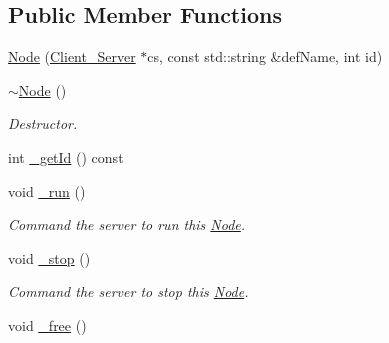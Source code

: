 \subsection*{Public Member Functions}
\begin{DoxyCompactItemize}
\item 
\hyperlink{classColliderPlusPlus_1_1Node_ab0bc89b38db96dea7086833453b8bf12}{Node} (\hyperlink{classColliderPlusPlus_1_1Client__Server}{Client\-\_\-\-Server} $\ast$cs, const std\-::string \&def\-Name, int id)
\item 
\hypertarget{classColliderPlusPlus_1_1Node_ae1198291ae5d81dd34474b7cf52438cd}{\hyperlink{classColliderPlusPlus_1_1Node_ae1198291ae5d81dd34474b7cf52438cd}{$\sim$\-Node} ()}\label{classColliderPlusPlus_1_1Node_ae1198291ae5d81dd34474b7cf52438cd}

\begin{DoxyCompactList}\small\item\em Destructor. \end{DoxyCompactList}\item 
int \hyperlink{classColliderPlusPlus_1_1Node_a261794de64a2198ca94e2c6410f3845f}{\-\_\-get\-Id} () const 
\item 
\hypertarget{classColliderPlusPlus_1_1Node_a52a06de4f27d8e2e9410a474b90c4890}{void \hyperlink{classColliderPlusPlus_1_1Node_a52a06de4f27d8e2e9410a474b90c4890}{\-\_\-run} ()}\label{classColliderPlusPlus_1_1Node_a52a06de4f27d8e2e9410a474b90c4890}

\begin{DoxyCompactList}\small\item\em Command the server to run this \hyperlink{classColliderPlusPlus_1_1Node}{Node}. \end{DoxyCompactList}\item 
\hypertarget{classColliderPlusPlus_1_1Node_ad038d5f7d52e71915b3cb9053ff037ae}{void \hyperlink{classColliderPlusPlus_1_1Node_ad038d5f7d52e71915b3cb9053ff037ae}{\-\_\-stop} ()}\label{classColliderPlusPlus_1_1Node_ad038d5f7d52e71915b3cb9053ff037ae}

\begin{DoxyCompactList}\small\item\em Command the server to stop this \hyperlink{classColliderPlusPlus_1_1Node}{Node}. \end{DoxyCompactList}\item 
\hypertarget{classColliderPlusPlus_1_1Node_a600fbe666439888a7615dd045abf915a}{void \hyperlink{classColliderPlusPlus_1_1Node_a600fbe666439888a7615dd045abf915a}{\-\_\-free} ()}\label{classColliderPlusPlus_1_1Node_a600fbe666439888a7615dd045abf915a}


\end{DoxyCompactItemize}
